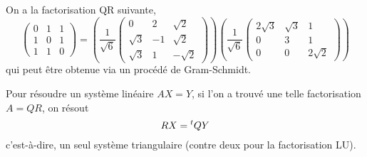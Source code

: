   
  \begin{example}
    On a la factorisation QR suivante,
    \[ \begin{pmatrix} 0 & 1 & 1 \\ 1 & 0 & 1 \\ 1 & 1 & 0 \end{pmatrix} = \left( \frac{1}{\sqrt{6}} \begin{pmatrix} 0 & 2 & \sqrt{2} \\ \sqrt{3} & -1 & \sqrt{2} \\ \sqrt{3} & 1 & -\sqrt{2} \end{pmatrix} \right) \left( \frac{1}{\sqrt{6}} \begin{pmatrix} 2\sqrt{3} & \sqrt{3} & 1 \\ 0 & 3 & 1 \\ 0 & 0 & 2\sqrt{2} \end{pmatrix} \right) \]
    qui peut être obtenue via un procédé de Gram-Schmidt.
  \end{example}
  
  
  \begin{remark}
    Pour résoudre un système linéaire $AX = Y$, si l'on a trouvé une telle factorisation $A = QR$, on résout
    \[ RX = \mathstrut ^t QY \]
    c'est-à-dire, un seul système triangulaire (contre deux pour la factorisation LU).
  \end{remark}

